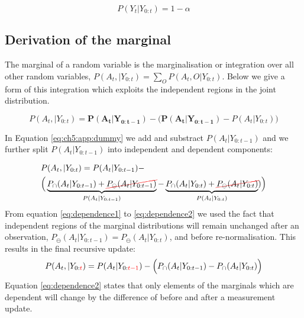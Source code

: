 \begin{equation}\label{eq:marginal_liklihood_final}
 P(Y_t|Y_{0:t}) = 1 - \alpha
\end{equation}


\subsection{Derivation of the marginal}\label{appendix:marginal}

The marginal of a random variable is the marginalisation or integration over all other random variables, $P(A_t,|Y_{0:t}) = \sum\limits_{O} P(A_t,O|Y_{0:t})$. Below 
we give a form of this integration which exploits the independent regions in the joint distribution.

\begin{equation} \label{eq:ch5:app:dummy}
 P(A_t,|Y_{0:t}) = \mathbf{P(A_t|Y_{0:t-1})} - \Big(\mathbf{P(A_t|Y_{0:t-1})} - P(A_t|Y_{0:t}) \Big) 
\end{equation}

In Equation \ref{eq:ch5:app:dummy} we add and substract $P(A_t|Y_{0:t-1})$ and we further split 
$P(A_t|Y_{0:t-1})$ into independent and dependent components: 

\begin{align}
  &P(A_t,|Y_{0:t}) =  P(A_t|Y_{0:t-1}) - \nonumber \\ 
  &\Big(\underbrace{P_{\cap}(A_t|Y_{0:t-1}) + \Ccancel[red]{P_{\ominus}(A_t|Y_{0:t-1})}}_{P(A_t|Y_{0:t-1})} -  \underbrace{P_{\cap}(A_t|Y_{0:t}) + \Ccancel[red]{P_{\ominus}(A_t|Y_{0:t})}}_{P(A_t|Y_{0:t})})   \Big) \label{eq:dependence1} 
\end{align}
From equation \ref{eq:dependence1} to \ref{eq:dependence2} we used the fact that independent regions of the marginal distributions will remain unchanged after
an observation, $P_{\ominus}(A_t|Y_{0:t-1}) = P_{\ominus}(A_t|Y_{0:t})$, and before re-normalisation. This results in the final recursive update:
\begin{equation}
 P(A_t,|Y_{0:\color{red}{t}}) =  P(A_t|Y_{0:\color{red}{t-1}}) - \Big(P_{\cap}(A_t|Y_{0:t-1}) -  P_{\cap}(A_t|Y_{0:t})  \Big) \label{eq:dependence2} 
\end{equation}
Equation \ref{eq:dependence2} states that only elements of the marginals which are dependent will change by the difference of before and after 
a measurement update.


